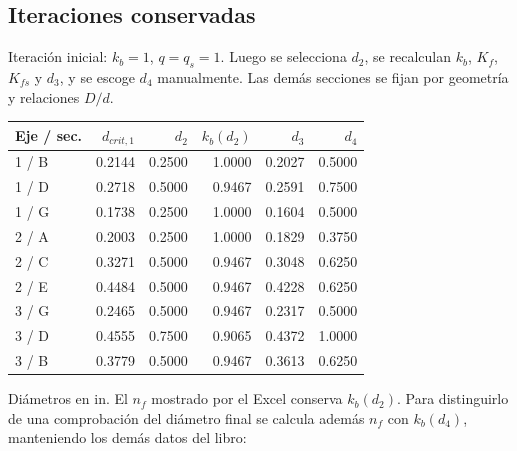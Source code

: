 \documentclass[11pt,a4paper]{article}
\begin{document}
\subsection{Iteraciones conservadas}
Iteración inicial: $k_b=1$, $q=q_s=1$. Luego se selecciona $d_2$, se recalculan $k_b$, $K_f$, $K_{fs}$ y $d_3$, y se escoge $d_4$ manualmente. Las demás secciones se fijan por geometría y relaciones $D/d$.

\begin{center}\small\begin{tabular}{lrrrrr}\toprule

Eje / sec. & $d_{crit,1}$ & $d_2$ & $k_b(d_2)$ & $d_3$ & $d_4$ \\ \midrule

1 / B & 0.2144 & 0.2500 & 1.0000 & 0.2027 & 0.5000 \\

1 / D & 0.2718 & 0.5000 & 0.9467 & 0.2591 & 0.7500 \\

1 / G & 0.1738 & 0.2500 & 1.0000 & 0.1604 & 0.5000 \\

2 / A & 0.2003 & 0.2500 & 1.0000 & 0.1829 & 0.3750 \\

2 / C & 0.3271 & 0.5000 & 0.9467 & 0.3048 & 0.6250 \\

2 / E & 0.4484 & 0.5000 & 0.9467 & 0.4228 & 0.6250 \\

3 / G & 0.2465 & 0.5000 & 0.9467 & 0.2317 & 0.5000 \\

3 / D & 0.4555 & 0.7500 & 0.9065 & 0.4372 & 1.0000 \\

3 / B & 0.3779 & 0.5000 & 0.9467 & 0.3613 & 0.6250 \\

\bottomrule\end{tabular}\end{center}

Diámetros en in. El $n_f$ mostrado por el Excel conserva $k_b(d_2)$. Para distinguirlo de una comprobación del diámetro final se calcula además $n_f$ con $k_b(d_4)$, manteniendo los demás datos del libro:
\end{document}
